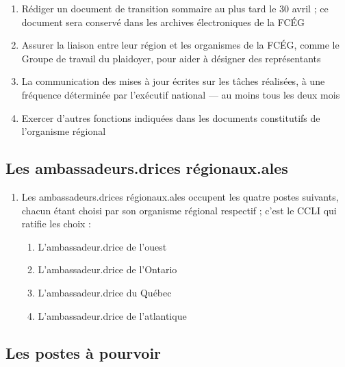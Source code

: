 \begin{enumerate}
\begin{enumerate}
    \begin{enumerate}
     \item
      Septembre ou octobre pour réviser le Sommet du développement des associations en ingénierie
     \item
      Janvier pour réviser le CCLI
    \end{enumerate}
   \item
    Rédiger un document de transition sommaire au plus tard le 30 avril ; ce document sera conservé dans les archives électroniques de la FCÉG
   \item
    Assurer la liaison entre leur région et les organismes de la FCÉG, comme le Groupe de travail du plaidoyer, pour aider à désigner des représentants
   \item
    La communication des mises à jour écrites sur les tâches réalisées, à une fréquence déterminée par l'exécutif national — au moins tous les deux mois
   \item
    Exercer d'autres fonctions indiquées dans les documents constitutifs de l'organisme régional
  \end{enumerate}
\end{enumerate}

\subsection{Les ambassadeurs.drices régionaux.ales}
\label{les-ambassadeurs-drices-regionaux-ales-2}

\begin{enumerate}
 \item
  Les ambassadeurs.drices régionaux.ales occupent les quatre postes suivants, chacun étant choisi par son organisme régional respectif ; c'est le CCLI qui ratifie les choix :

  \begin{enumerate}
   \item
    L'ambassadeur.drice de l'ouest
   \item
    L'ambassadeur.drice de l'Ontario
   \item
    L'ambassadeur.drice du Québec
   \item
    L'ambassadeur.drice de l'atlantique
  \end{enumerate}
\end{enumerate}

\subsection{Les postes à pourvoir}
\label{les-postes-a-pourvoir-3}

